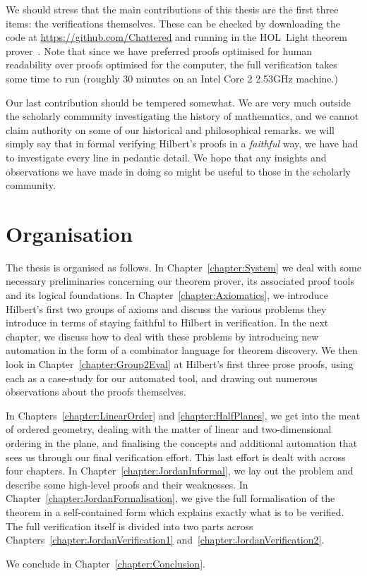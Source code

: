 We should stress that the main contributions of this thesis are the first three items: the verifications themselves. These can be checked by downloading the code at \url{https://github.com/Chattered} and running in the HOL~Light theorem prover~\cite{HOLLight}. Note that since we have preferred proofs optimised for human readability over proofs optimised for the computer, the full verification takes some time to run (roughly 30 minutes on an Intel Core 2 2.53GHz machine.)

Our last contribution should be tempered somewhat. We are very much outside the scholarly community investigating the history of mathematics, and we cannot claim authority on some of our historical and philosophical remarks. we will simply say that in formal verifying Hilbert's proofs in a \emph{faithful} way, we have had to investigate every line in pedantic detail. We hope that any insights and observations we have made in doing so might be useful to those in the scholarly community.

\section{Organisation}
The thesis is organised as follows. In Chapter~\ref{chapter:System} we deal with some necessary preliminaries concerning our theorem prover, its associated proof tools and its logical foundations. In Chapter~\ref{chapter:Axiomatics}, we introduce Hilbert's first two groups of axioms and discuss the various problems they introduce in terms of staying faithful to Hilbert in verification. In the next chapter, we discuss how to deal with these problems by introducing new automation in the form of a combinator language for theorem discovery. We then look in Chapter~\ref{chapter:Group2Eval} at Hilbert's first three prose proofs, using each as a case-study for our automated tool, and drawing out numerous observations about the proofs themselves. 

In Chapters~\ref{chapter:LinearOrder} and \ref{chapter:HalfPlanes}, we get into the meat of ordered geometry, dealing with the matter of linear and two-dimensional ordering in the plane, and finalising the concepts and additional automation that sees us through our final verification effort. This last effort is dealt with across four chapters. In Chapter~\ref{chapter:JordanInformal}, we lay out the problem and describe some high-level proofs and their weaknesses. In Chapter~\ref{chapter:JordanFormalisation}, we give the full formalisation of the theorem in a self-contained form which explains exactly what is to be verified. The full verification itself is divided into two parts across Chapters~\ref{chapter:JordanVerification1} and~\ref{chapter:JordanVerification2}.

We conclude in Chapter~\ref{chapter:Conclusion}. 

